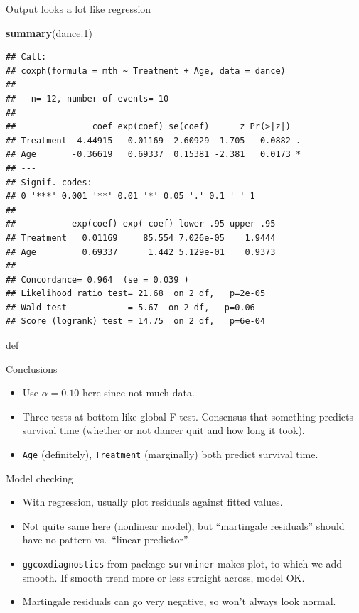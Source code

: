 \documentclass[ignorenonframetext,]{beamer}
\newenvironment{Shaded}{\begin{snugshade}}{\end{snugshade}}
\newcommand{\FloatTok}[1]{\textcolor[rgb]{0.00,0.00,0.81}{#1}}
\newcommand{\KeywordTok}[1]{\textcolor[rgb]{0.13,0.29,0.53}{\textbf{#1}}}
\newcommand{\NormalTok}[1]{#1}
\begin{document}
\begin{frame}[fragile]{Output looks a lot like regression}
\protect\hypertarget{output-looks-a-lot-like-regression}{}

\begin{Shaded}
\begin{Highlighting}[]
\KeywordTok{summary}\NormalTok{(dance}\FloatTok{.1}\NormalTok{)}
\end{Highlighting}
\end{Shaded}

\begin{verbatim}
## Call:
## coxph(formula = mth ~ Treatment + Age, data = dance)
## 
##   n= 12, number of events= 10 
## 
##               coef exp(coef) se(coef)      z Pr(>|z|)  
## Treatment -4.44915   0.01169  2.60929 -1.705   0.0882 .
## Age       -0.36619   0.69337  0.15381 -2.381   0.0173 *
## ---
## Signif. codes:  
## 0 '***' 0.001 '**' 0.01 '*' 0.05 '.' 0.1 ' ' 1
## 
##           exp(coef) exp(-coef) lower .95 upper .95
## Treatment   0.01169     85.554 7.026e-05    1.9444
## Age         0.69337      1.442 5.129e-01    0.9373
## 
## Concordance= 0.964  (se = 0.039 )
## Likelihood ratio test= 21.68  on 2 df,   p=2e-05
## Wald test            = 5.67  on 2 df,   p=0.06
## Score (logrank) test = 14.75  on 2 df,   p=6e-04
\end{verbatim}

def

\end{frame}

\begin{frame}[fragile]{Conclusions}
\protect\hypertarget{conclusions-1}{}

\begin{itemize}
\item
  Use \(\alpha=0.10\) here since not much data.
\item
  Three tests at bottom like global F-test. Consensus that something
  predicts survival time (whether or not dancer quit and how long it
  took).
\item
  \texttt{Age} (definitely), \texttt{Treatment} (marginally) both
  predict survival time.
\end{itemize}

\end{frame}

\begin{frame}[fragile]{Model checking}
\protect\hypertarget{model-checking}{}

\begin{itemize}
\item
  With regression, usually plot residuals against fitted values.
\item
  Not quite same here (nonlinear model), but ``martingale residuals''
  should have no pattern vs.~``linear predictor''.
\item
  \texttt{ggcoxdiagnostics} from package \texttt{survminer} makes plot,
  to which we add smooth. If smooth trend more or less straight across,
  model OK.
\item
  Martingale residuals can go very negative, so won't always look
  normal.
\end{itemize}

\end{frame}
\end{document}
